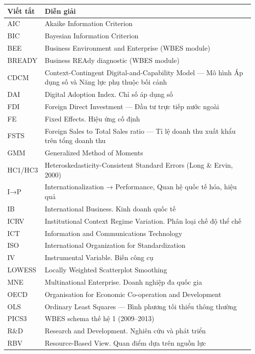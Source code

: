 \documentclass[12pt,a4paper]{article}
\begin{document}
\begin{longtable}[]{@{}ll@{}}
\toprule\noalign{}
Viết tắt & Diễn giải \\
\midrule\noalign{}
\endhead
\bottomrule\noalign{}
\endlastfoot
AIC & Akaike Information Criterion \\
BIC & Bayesian Information Criterion \\
BEE & Business Environment and Enterprise (WBES module) \\
BREADY & Business REAdy diagnostic (WBES module) \\
CDCM & Context-Contingent Digital-and-Capability Model --- Mô hình Áp
dụng số và Năng lực phụ thuộc bối cảnh \\
DAI & Digital Adoption Index. Chỉ số áp dụng số \\
FDI & Foreign Direct Investment --- Đầu tư trực tiếp nước ngoài \\
FE & Fixed Effects. Hiệu ứng cố định \\
FSTS & Foreign Sales to Total Sales ratio --- Tỉ lệ doanh thu xuất khẩu
trên tổng doanh thu \\
GMM & Generalized Method of Moments \\
HC1/HC3 & Heteroskedasticity-Consistent Standard Errors (Long \& Ervin,
2000) \\
I→P & Internationalization → Performance, Quan hệ quốc tế hóa, hiệu
quả \\
IB & International Business. Kinh doanh quốc tế \\
ICRV & Institutional Context Regime Variation. Phân loại chế độ thể
chế \\
ICT & Information and Communications Technology \\
ISO & International Organization for Standardization \\
IV & Instrumental Variable. Biến công cụ \\
LOWESS & Locally Weighted Scatterplot Smoothing \\
MNE & Multinational Enterprise. Doanh nghiệp đa quốc gia \\
OECD & Organisation for Economic Co-operation and Development \\
OLS & Ordinary Least Squares --- Bình phương tối thiểu thông thường \\
PICS3 & WBES schema thế hệ 1 (2009--2013) \\
R\&D & Research and Development. Nghiên cứu và phát triển \\
RBV & Resource-Based View. Quan điểm dựa trên nguồn lực \\

\end{longtable}
\end{document}

